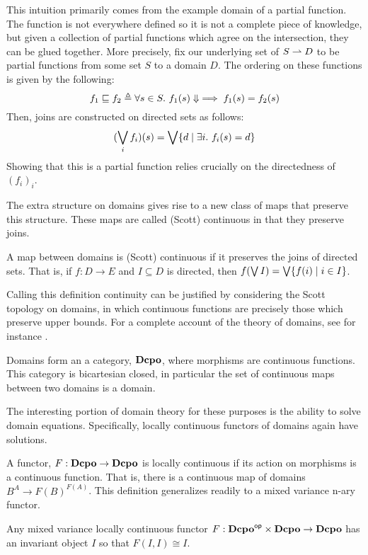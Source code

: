 This intuition primarily comes from the example domain of a partial
function. The function is not everywhere defined so it is not a
complete piece of knowledge, but given a collection of partial
functions which agree on the intersection, they can be glued
together. More precisely, fix our underlying set of $S \rightharpoonup D$ to be
partial functions from some set $S$ to a domain $D$. The ordering on
these functions is given by the following:
\[
  f_1 \mathrel{\sqsubseteq} f_2 \mathrel{\triangleq} \forall s \in S.\ f_1(s) \Downarrow \implies f_1(s) = f_2(s)
\]
Then, joins are constructed on directed sets as follows:
\[
  (\bigvee_i f_i)(s) = \bigvee \{d \mid \exists i.\ f_i(s) = d\}
\]
Showing that this is a partial function relies crucially on the
directedness of $(f_i)_i$.

The extra structure on domains gives rise to a new class of maps that
preserve this structure. These maps are called (Scott) continuous in
that they preserve joins.
\begin{defn}
  A map between domains is (Scott) continuous if it preserves the
  joins of directed sets. That is, if $f : D \to E$ and
  $I \subseteq D$ is directed, then
  $f(\bigvee I) = \bigvee \{f(i) \mid i \in I\}$.
\end{defn}
Calling this definition continuity can be justified by considering the
Scott topology on domains, in which continuous functions are precisely
those which preserve upper bounds. For a complete account of the
theory of domains, see for instance \citet{Girez:03,Abramsky:94}.
\begin{thm}
  Domains form an a category, $\mathbf{Dcpo}$, where morphisms are continuous
  functions. This category is bicartesian closed, in particular the
  set of continuous maps between two domains is a domain.
\end{thm}
The interesting portion of domain theory for these purposes is the
ability to solve domain equations. Specifically, locally continuous
functors of domains again have solutions.
\begin{defn}
  A functor, $F : \mathbf{Dcpo} \to \mathbf{Dcpo}$ is locally continuous if its action
  on morphisms is a continuous function. That is, there is a
  continuous map of domains $B^A \to F(B)^{F(A)}$. This definition
  generalizes readily to a mixed variance n-ary functor.
\end{defn}
\begin{thm}\label{thm:domains:fixed-points}
  Any mixed variance locally continuous functor
  $F : \mathbf{Dcpo}^{\mathsf{op}} \times \mathbf{Dcpo} \to \mathbf{Dcpo}$ has an invariant object $I$
  so that $F(I, I) \cong I$.
\end{thm}

